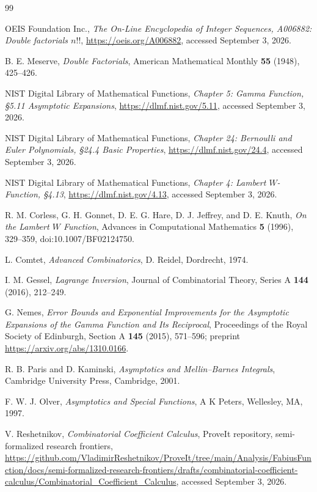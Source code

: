 \documentclass[11pt,a4paper,oneside]{book}
\begin{document}
\backmatter

\begin{thebibliography}{99}

OEIS Foundation Inc.,
\emph{The On-Line Encyclopedia of Integer Sequences, A006882:
Double factorials \(n!!\)},
\url{https://oeis.org/A006882},
accessed September 3, 2026.

B. E. Meserve,
\emph{Double Factorials},
American Mathematical Monthly \textbf{55} (1948), 425--426.

NIST Digital Library of Mathematical Functions,
\emph{Chapter 5: Gamma Function, \S5.11 Asymptotic Expansions},
\url{https://dlmf.nist.gov/5.11},
accessed September 3, 2026.

NIST Digital Library of Mathematical Functions,
\emph{Chapter 24: Bernoulli and Euler Polynomials, \S24.4 Basic Properties},
\url{https://dlmf.nist.gov/24.4},
accessed September 3, 2026.

NIST Digital Library of Mathematical Functions,
\emph{Chapter 4: Lambert \(W\)-Function, \S4.13},
\url{https://dlmf.nist.gov/4.13},
accessed September 3, 2026.

R. M. Corless, G. H. Gonnet, D. E. G. Hare,
D. J. Jeffrey, and D. E. Knuth,
\emph{On the Lambert \(W\) Function},
Advances in Computational Mathematics \textbf{5} (1996), 329--359,
doi:10.1007/BF02124750.

L. Comtet,
\emph{Advanced Combinatorics},
D. Reidel, Dordrecht, 1974.

I. M. Gessel,
\emph{Lagrange Inversion},
Journal of Combinatorial Theory, Series A \textbf{144} (2016), 212--249.

G. Nemes,
\emph{Error Bounds and Exponential Improvements for the Asymptotic
Expansions of the Gamma Function and Its Reciprocal},
Proceedings of the Royal Society of Edinburgh, Section A
\textbf{145} (2015), 571--596;
preprint \url{https://arxiv.org/abs/1310.0166}.

R. B. Paris and D. Kaminski,
\emph{Asymptotics and Mellin--Barnes Integrals},
Cambridge University Press, Cambridge, 2001.

F. W. J. Olver,
\emph{Asymptotics and Special Functions},
A K Peters, Wellesley, MA, 1997.

V. Reshetnikov,
\emph{Combinatorial Coefficient Calculus},
ProveIt repository, semi-formalized research frontiers,
\url{https://github.com/VladimirReshetnikov/ProveIt/tree/main/Analysis/FabiusFunction/docs/semi-formalized-research-frontiers/drafts/combinatorial-coefficient-calculus/Combinatorial_Coefficient_Calculus},
accessed September 3, 2026.


\end{thebibliography}
\end{document}

